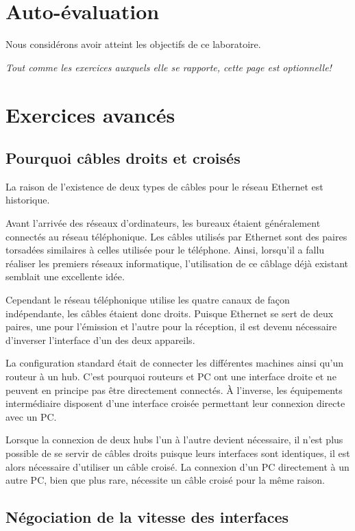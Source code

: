 \documentclass[11pt,a4paper]{article}
\begin{document}
\section{Auto-évaluation}

Nous considérons avoir atteint les objectifs de ce laboratoire.

\pagebreak

\textit{Tout comme les exercices auxquels elle se rapporte, cette page est optionnelle!}

\section{Exercices avancés}

\subsection{Pourquoi câbles droits et croisés}

La raison de l'existence de deux types de câbles pour le réseau Ethernet est historique.

Avant l'arrivée des réseaux d'ordinateurs, les bureaux étaient généralement connectés au réseau téléphonique. Les câbles utilisés par Ethernet sont des paires torsadées similaires à celles utilisée pour le téléphone. Ainsi, lorsqu'il a fallu réaliser les premiers réseaux informatique, l'utilisation de ce câblage déjà existant semblait une excellente idée.

Cependant le réseau téléphonique utilise les quatre canaux de façon indépendante, les câbles étaient donc droits. Puisque Ethernet se sert de deux paires, une pour l'émission et l'autre pour la réception, il est devenu nécessaire d'inverser l'interface d'un des deux appareils.

La configuration standard était de connecter les différentes machines ainsi qu'un routeur à un hub. C'est pourquoi routeurs et PC ont une interface droite et ne peuvent en principe pas être directement connectés. À l'inverse, les équipements intermédiaire disposent d'une interface croisée permettant leur connexion directe avec un PC.

Lorsque la connexion de deux hubs l'un à l'autre devient nécessaire, il n'est plus possible de se servir de câbles droits puisque leurs interfaces sont identiques, il est alors nécessaire d'utiliser un câble croisé. La connexion d'un PC directement à un autre PC, bien que plus rare, nécessite un câble croisé pour la même raison.

\subsection{Négociation de la vitesse des interfaces}
\end{document}
